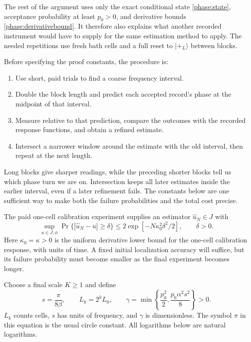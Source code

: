 \documentclass[11pt,a4paper]{article}
\numberwithin{equation}{section}
\theoremstyle{remark}
\begin{document}
The rest of the argument uses only the exact conditional state
\eqref{phase:state}, acceptance probability at least $p_0>0$, and derivative
bounds \eqref{phase:derivativebound}.  It therefore also explains what another
recorded instrument would have to supply for the same estimation method to
apply.  The needed repetitions use fresh bath cells and a full reset to
$|+_L\rangle$ between blocks.

Before specifying the proof constants, the procedure is:
\begin{enumerate}
\item Use short, paid trials to find a coarse frequency interval.
\item Double the block length and predict each accepted record's phase at
the midpoint of that interval.
\item Measure relative to that prediction, compare the outcomes with the
recorded response functions, and obtain a refined estimate.
\item Intersect a narrower window around the estimate with the old interval,
then repeat at the next length.
\end{enumerate}
Long blocks give sharper readings, while the preceding shorter blocks tell
us which phase turn we are on.  Intersection keeps all later estimates
inside the earlier interval, even if a later refinement fails.  The constants
below are one sufficient way to make both the failure probabilities and the
total cost precise.

The paid one-cell calibration experiment supplies an estimator
$\widehat u_N\in J$ with
\begin{equation}
 \sup_{u\in J,\phi}
 \Pr\{|\widehat u_N-u|\ge\delta\}
 \le2\exp[-N\kappa_0^2\delta^2/2],
 \qquad \delta>0.
 \label{phase:coarsebound}
\end{equation}
Here $\kappa_0=\kappa>0$ is the uniform derivative lower bound for the one-cell
calibration response, with units of time.  A fixed initial localization
accuracy will suffice, but its failure probability must become smaller as
the final experiment becomes longer.

Choose a final scale $K\ge1$ and define
\begin{equation}
 s=\frac{\pi}{8\beta},\qquad
 L_k=2^kL_0,\qquad
 \gamma=\min\left\{\frac{p_0^2}{2},
                   \frac{p_0\alpha^2s^2}{8}\right\}>0.
 \label{phase:scheduleconstants}
\end{equation}
$L_k$ counts cells, $s$ has units of frequency, and $\gamma$ is
dimensionless.  The symbol $\pi$ in this equation is the usual circle
constant.  All logarithms below are natural logarithms.
\end{document}
